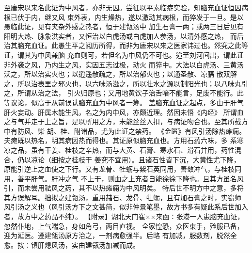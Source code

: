 \documentclass[a4paper,12pt,UTF8,twoside]{ctexbook}
\begin{document}
至唐宋以来名此证为中风者，亦非无因。尝征以平素临症实验，知脑充血证恒因病根已伏于内，继又风 
束外表，内生燥热，遂以激动其病根，而猝发于一旦。是以愚临此证，见有夹杂外感之热者，恒于建瓴汤中 
加生石膏一两；或两三日后见有阳明大热、脉象洪实者，又恒治以白虎汤或白虎加人参汤，以清外感之热， 
而后治其脑充血证。此愚生平之阅历所得，而非为唐宋以来之医家讳过也。然究之此等证，谓其为中风兼脑 
充血则可，若但名为中风仍不可也。迨至刘河间出，谓此证非外袭之风，乃内生之风，实因五志过极，动火 
而猝中。大法以白虎汤、三黄汤沃之，所以治实火也；以逍遥散疏之，所以治郁火也；以通圣散、凉膈 
散双解之，所以治表里之邪火也，以六味汤滋之，所以壮水之源以制阳光也；以八味丸引之，所谓从治之法， 
引火归原也；又用地黄饮子治舌喑不能言，足废不能行。此等议论，似高于从前误认脑充血为中风者一筹。 
盖脑充血证之起点，多由于肝气肝火妄动。肝属木能生风，名之为内中风，亦颇近理。然因未悟《内经》 
所谓血之与气并走于上之旨，是以所用之方，未能丝丝入扣，与病证吻合也。至其所载方中有防风、柴 
胡、桂、附诸品，尤为此证之禁药。 
《金匮》有风引汤除热瘫痫。夫瘫既以热名，明其病因热而得也。其证原似脑充血也。方用石药六味，多 
系寒凉之品，虽有干姜、桂枝之辛热，而与大黄、石膏、寒水石、滑石并用，药性混合，仍以凉论（细按之桂枝干 
姜究不宜用）。且诸石性皆下沉，大黄性尤下降， 
原能引逆上之血使之下行。又有龙骨、牡蛎与紫石英同用，善敛冲气，与桂枝同用，善平肝气。肝冲之气 
不上干，则血之上充者自能徐徐下降也。且其方虽名风引，而未尝用祛风之药，其不以热瘫痫为中风明矣。 
特后世不明方中之意，多将其方误解耳。拙拟之建瓴汤，重用赭石、龙骨、牡蛎，且有加石膏之时，实窃师 
风引汤之义也（风引汤方下之文甚简，似非仲景笔墨，故方书多有疑此系后世加入者，故方中之药品不纯）。 
【附录】湖北天门崔××来函∶张港一人患脑充血证，忽然仆地，上气喘急，身如角弓，两目直视。 
全家惶恐，众医束手，殓服已备，迎为延医。遵建瓴汤原方治之，一剂病愈强半。后略 
有加减，服数剂，脱然全愈。按∶镇肝熄风汤，实由建瓴汤加减而成。 
\end{document}

